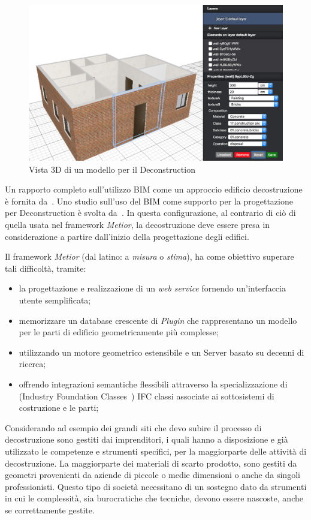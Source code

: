 \begin{figure}[htbp] %
   \centering
   \includegraphics[width=1\linewidth]{images/3d-sel}
   \caption{Vista 3D di un modello per il Deconstruction}
   \label{fig:augmented}
\end{figure}

Un rapporto completo sull'utilizzo BIM come un approccio edificio decostruzione è fornita da~\cite{galic2014bim}.
Uno studio sull'uso del BIM come supporto per la progettazione per Deconstruction è svolta da~\cite{akinade2015waste}.
In questa configurazione, al contrario di ciò di quella usata nel framework \emph{Metior}, la decostruzione deve essere
presa in considerazione a partire dall'inizio della progettazione degli edifici.
\newpage


Il framework \emph{Metior} (dal latino: a \emph{misura} o \emph{stima}),
ha come obiettivo superare tali difficoltà, tramite:
\begin{itemize}
  \item la progettazione e realizzazione di un \emph{web service} fornendo un'interfaccia utente semplificata;
  \item memorizzare un database crescente di \emph{Plugin} che rappresentano un modello per le parti di edificio geometricamente più complesse;
  \item utilizzando un motore geometrico estensibile e un Server basato su decenni di ricerca;
  \item offrendo integrazioni semantiche flessibili attraverso la specializzazione di (Industry Foundation Classes~\cite{ifc})
        IFC classi associate ai sottosistemi di costruzione e le parti;
\end{itemize}


Considerando ad esempio dei grandi siti che devo subire il processo di decostruzione
sono gestiti dai imprenditori, i quali hanno a disposizione e già utilizzato le competenze e strumenti specifici,
per la maggiorparte delle attività di decostruzione. La maggiorparte dei materiali di scarto prodotto,
sono gestiti da geometri provenienti da aziende di piccole o medie dimensioni o anche da singoli professionisti.
Questo tipo di società necessitano di un sostegno dato da strumenti in cui le complessità,
sia burocratiche che tecniche, devono essere nascoste, anche se correttamente gestite.
